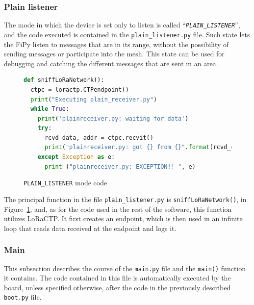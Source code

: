 			\subsubsection{Plain listener}
			
				The mode in which the device is set only to listen is called ``\textit{\texttt{PLAIN\_LISTENER}}'', and the code executed is contained in the \texttt{plain\_listener.py} file.
				Such state lets the FiPy listen to messages that are in its range, without the possibility of sending messages or participate into the mesh.
				This state can be used for debugging and catching the different messages that are sent in an area.
				
				\begin{figure}[H]
					\begin{lstlisting}[language=python]
def sniffLoRaNetwork():
  ctpc = loractp.CTPendpoint()
  print("Executing plain_receiver.py")
  while True:
    print('plainreceiver.py: waiting for data')
    try:
      rcvd_data, addr = ctpc.recvit()
      print("plainreceiver.py: got {} from {}".format(rcvd_data, addr))
    except Exception as e:
      print ("plainreceiver.py: EXCEPTION!! ", e)
					\end{lstlisting}
					\caption{\texttt{PLAIN\_LISTENER} mode code}
					\label{code:plain_listener}
				\end{figure}

				The principal function in the file \texttt{plain\_listener.py} is \texttt{sniffLoRaNetwork()}, in Figure~\ref{code:plain_listener}, and, as for the code used in the rest of the software, this function utilizes LoRaCTP.
				It first creates an endpoint, which is then used in an infinite loop that reads data received at the endpoint and logs it.
			
			\subsubsection{Main}
			
				This subsection describes the course of the \texttt{main.py} file and the \texttt{main()} function it contains.
				The code contained in this file is automatically executed by the board, unless specified otherwise, after the code in the previously described \texttt{boot.py} file.
				
